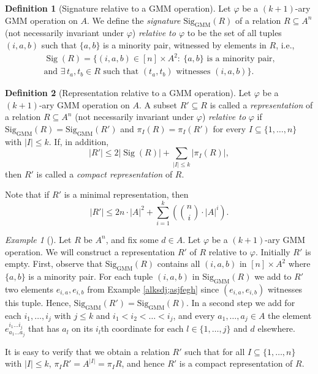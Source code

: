 \documentclass{article}
\theoremstyle{definition}
\newtheorem{df}{Definition}
\theoremstyle{theorem}
\theoremstyle{theorem}
\theoremstyle{remark}
\theoremstyle{remark}
\theoremstyle{example}
\newtheorem{ex}{Example}
\theoremstyle{notation}
\theoremstyle{theorem}
\begin{document}
\begin{df}[Signature relative to a GMM operation]
Let $\varphi$ be a $(k+1)$-ary GMM operation on $A$. We define the \emph{signature} $\operatorname{Sig_{GMM}}(R)$ of a relation $R\subseteq A^n$ (not
necessarily invariant under $\varphi$) \emph{relative to $\varphi$} to be the set of all tuples $(i, a, b)$ such that $\{a, b\}$ is a minority pair, witnessed by elements in $R$, i.e.,
\begin{gather*}
    \operatorname{Sig}(R) = \{(i, a, b) \in [n] \times A^2 :\ \{a, b\} \text{ is a minority pair,} \\\text{and } \exists\, t_a, t_b \in R \text{ such that } (t_a, t_b) \text{ witnesses } (i, a, b)\}.
\end{gather*}
\end{df}


\begin{df}[Representation relative to a GMM operation]
Let $\varphi$ be a $(k+1)$-ary GMM operation on $A$. A subset $R' \subseteq R$ is called a \emph{representation} of a relation $R\subseteq A^n$ (not
necessarily invariant under $\varphi$) \emph{relative to} $\varphi$ if $\operatorname{Sig_{GMM}}(R) = \operatorname{Sig_{GMM}}(R')$ and $\pi_I(R) = \pi_I(R')$ for every $I \subseteq \{1, \ldots, n\}$ with $|I| \leq k$. If, in addition,
\[
|R'| \leq 2|\operatorname{Sig}(R)| + \sum_{|I| \leq k} |\pi_I(R)|,
\]
then $R'$ is called a \emph{compact representation} of $R$.
\end{df}

Note that if $R'$ is a minimal representation, then
$$|R'| \leq 2n \cdot |A|^2 + \sum_{i=1}^k( \binom{n}{i} \cdot |A|^i).$$


\begin{ex}[\cite{lmcs:2237}]\label{++++____((JHJHJH} Let $R$ be $A^n$, and fix some $d\in A$. Let $\varphi$ be a $(k+1)$-ary GMM operation. We will construct a representation $R'$ of $R$ relative to $\varphi$. Initially $R'$ is empty. First, observe that $\operatorname{Sig_{GMM}}(R)$ contains all $(i,a,b)$ in $[n]\times A^2$ where $\{a,b\}$ is a minority pair. For each tuple $(i,a,b)$ in $\operatorname{Sig_{GMM}}(R)$ we add to $R'$ two elements $e_{i,a}, e_{i,b}$ from Example \ref{alksdj;asjfegh} since $(e_{i,a}, e_{i,b})$ witnesses this tuple. Hence, $\operatorname{Sig_{GMM}}(R')=\operatorname{Sig_{GMM}}(R)$. In a second step we add for each $i_1,\ldots,i_j$ with $j\leq k$ and $i_1<i_2<\ldots <i_j$, and every $a_1,\ldots,a_j\in A$ the element $e^{i_1\ldots i_j}_{a_1\ldots a_j}$ that has $a_l$ on its $i_l$th coordinate for each $l\in \{1,\ldots,j\}$ and $d$ elsewhere. 

It is easy to verify that we obtain
a relation $R'$ such that for all $I\subseteq \{1,\ldots,n\}$ with $|I|\leq k$, $\pi_IR' = A^{|I|} = \pi_IR$, and hence $R'$ is a compact representation of $R$. 
    
\end{ex}
\end{document}
